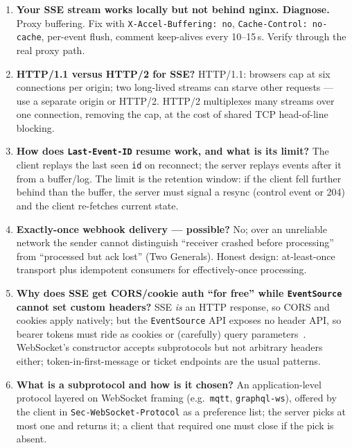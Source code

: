 \begin{enumerate}[label=\textbf{Q\arabic*.}, leftmargin=1.6cm, start=11]
        \texttt{curl}. Choose WebSocket only if operators must also
        \emph{send} low-latency commands on the same channel.
  \item \textbf{Your SSE stream works locally but not behind nginx. Diagnose.}
        Proxy buffering. Fix with \texttt{X-Accel-Buffering: no},
        \texttt{Cache-Control: no-cache}, per-event flush, comment
        keep-alives every 10--15\,s. Verify through the real proxy path.
  \item \textbf{HTTP/1.1 versus HTTP/2 for SSE?}
        HTTP/1.1: browsers cap at six connections per origin; two
        long-lived streams can starve other requests --- use a separate
        origin or HTTP/2. HTTP/2 multiplexes many streams over one
        connection, removing the cap, at the cost of shared TCP head-of-line
        blocking.
  \item \textbf{How does \texttt{Last-Event-ID} resume work, and what is its
        limit?}
        The client replays the last seen \texttt{id} on reconnect; the
        server replays events after it from a buffer/log. The limit is the
        retention window: if the client fell further behind than the buffer,
        the server must signal a resync (control event or 204) and the client
        re-fetches current state.
  \item \textbf{Exactly-once webhook delivery --- possible?}
        No; over an unreliable network the sender cannot distinguish
        ``receiver crashed before processing'' from ``processed but ack
        lost'' (Two Generals). Honest design: at-least-once transport plus
        idempotent consumers for effectively-once processing.
  \item \textbf{Why does SSE get CORS/cookie auth ``for free'' while
        \texttt{EventSource} cannot set custom headers?}
        SSE \emph{is} an HTTP response, so CORS and cookies apply natively;
        but the \texttt{EventSource} API exposes no header API, so bearer
        tokens must ride as cookies or (carefully) query
        parameters~\cite{rfc6749}. WebSocket's constructor accepts
        subprotocols but not arbitrary headers either; token-in-first-message
        or ticket endpoints are the usual patterns.
  \item \textbf{What is a subprotocol and how is it chosen?}
        An application-level protocol layered on WebSocket framing (e.g.\
        \texttt{mqtt}, \texttt{graphql-ws}), offered by the client in
        \texttt{Sec-WebSocket-Protocol} as a preference list; the server
        picks at most one and returns it; a client that required one must
        close if the pick is absent.
\end{enumerate}


